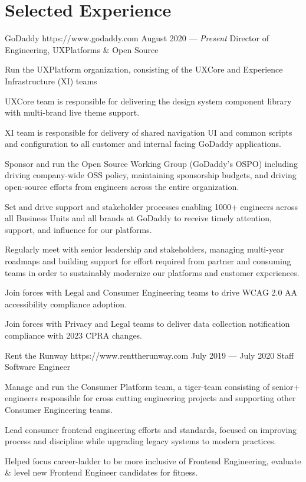 \documentclass{resume}
\begin{document}
\smallskip

\section{Selected Experience}

\employer
    {GoDaddy}
    {https://www.godaddy.com}
    {August 2020 --- \emph{Present}}
    {Director of Engineering, UXPlatforms \& Open Source }
    {\begin{jobitems}
        \item Run the UXPlatform organization, consisting of the UXCore and Experience Infrastructure (XI) teams
        \begin{jobitems}
            \item UXCore team is responsible for delivering the design system component library with multi-brand live theme support.
            \item XI team is responsible for delivery of shared navigation UI and common scripts and configuration to all customer and internal facing GoDaddy applications.
        \end{jobitems}
        \item Sponsor and run the Open Source Working Group (GoDaddy's OSPO) including driving company-wide OSS policy, maintaining sponsorship budgets, and driving open-source efforts from engineers across the entire organization.
        \item Set and drive support and stakeholder processes enabling 1000+ engineers across all Business Units and all brands at GoDaddy to receive timely attention, support, and influence for our platforms.
        \item Regularly meet with senior leadership and stakeholders, managing multi-year roadmaps and building support for effort required from partner and consuming teams in order to sustainably modernize our platforms and customer experiences.
        \item Join forces with Legal and Consumer Engineering teams to drive WCAG 2.0 AA accessibility compliance adoption.
        \item Join forces with Privacy and Legal teams to deliver data collection notification compliance with 2023 CPRA changes.
    \end{jobitems}}
\employer
    {Rent the Runway}
    {https://www.renttherunway.com}
    {July 2019 --- July 2020}
    {Staff Software Engineer}
    {\begin{jobitems}
        \item Manage and run the Consumer Platform team, a tiger-team consisting of senior+ engineers responsible for cross cutting engineering projects and supporting other Consumer Engineering teams.
        \item Lead consumer frontend engineering efforts and standards, focused on improving process and discipline while upgrading legacy systems to modern practices.
        \item Helped focus career-ladder to be more inclusive of Frontend Engineering, evaluate \& level new Frontend Engineer candidates for fitness.
    \end{jobitems}}
\end{document}
